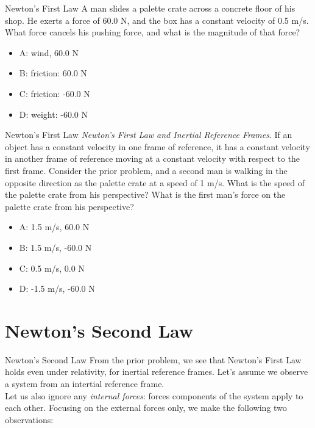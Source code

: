\documentclass{beamer}
\begin{document}
\begin{frame}{Newton's First Law}
A man slides a palette crate across a concrete floor of his shop.  He exerts a force of 60.0 N, and the box has a constant velocity of 0.5 m/s.  What force cancels his pushing force, and what is the magnitude of that force?
\begin{itemize}
\item A: wind, 60.0 N
\item B: friction: 60.0 N
\item C: friction: -60.0 N
\item D: weight: -60.0 N
\end{itemize}
\end{frame}

\begin{frame}{Newton's First Law}
\small
\textit{Newton's First Law and Inertial Reference Frames}.  If an object has a constant velocity in one frame of reference, it has a constant velocity in another frame of reference moving at a constant velocity with respect to the first frame.  Consider the prior problem, and a second man is walking in the opposite direction as the palette crate at a speed of 1 m/s.  What is the speed of the palette crate from his perspective?  What is the first man's force on the palette crate from his perspective?
\begin{itemize}
\item A: 1.5 m/s, 60.0 N
\item B: 1.5 m/s, -60.0 N
\item C: 0.5 m/s, 0.0 N 
\item D: -1.5 m/s, -60.0 N
\end{itemize}
\end{frame}

\section{Newton's Second Law}

\begin{frame}{Newton's Second Law}
From the prior problem, we see that \alert{Newton's First Law} holds even under relativity, for inertial reference frames.  Let's assume we observe a system from an intertial reference frame. \\
\vspace{0.5cm}
Let us also ignore any \textit{internal forces}: forces components of the system apply to each other.  Focusing on the external forces only, we make the following two observations: \\
\end{frame}
\end{document}
